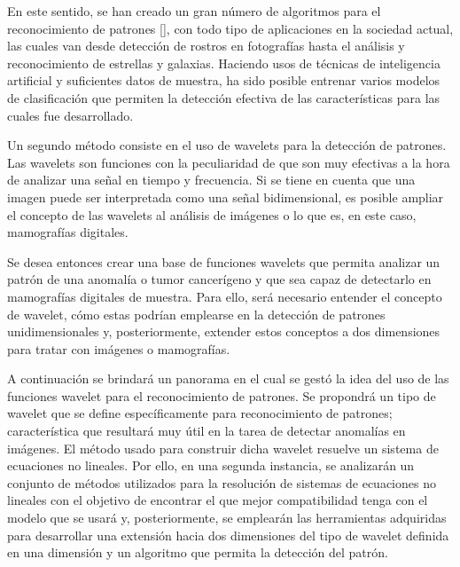 \par En este sentido, se han creado un gran n\'umero de algoritmos para el reconocimiento de patrones [\cite{20}], con todo tipo de aplicaciones en la sociedad actual, las cuales van desde detecci\'on de rostros en fotograf\'ias hasta el an\'alisis y reconocimiento de estrellas y galaxias. Haciendo usos de t\'ecnicas de inteligencia artificial y suficientes datos de muestra, ha sido posible entrenar varios modelos de clasificaci\'on que permiten la detecci\'on efectiva de las caracter\'isticas para las cuales fue desarrollado.

\par Un segundo m\'etodo consiste en el uso de wavelets para la detecci\'on de patrones. Las wavelets son funciones con la peculiaridad de que son muy efectivas a la hora de analizar una se\~nal en tiempo y frecuencia. Si se tiene en cuenta que una imagen puede ser interpretada como una se\~nal bidimensional, es posible ampliar el concepto de las wavelets al an\'alisis de im\'agenes o lo que es, en este caso, mamograf\'ias digitales.

\par Se desea entonces crear una base de funciones wavelets que permita analizar un patr\'on de una anomal\'ia o tumor cancer\'igeno y que sea capaz de detectarlo en mamograf\'ias digitales de muestra. Para ello, ser\'a necesario entender el concepto de wavelet, c\'omo estas podr\'ian emplearse en la detecci\'on de patrones unidimensionales y, posteriormente, extender estos conceptos a dos dimensiones para tratar con im\'agenes o mamograf\'ias.

\par A continuaci\'on se brindar\'a un panorama en el cual se gest\'o la idea del uso de las funciones wavelet para el reconocimiento de patrones. Se propondr\'a un tipo de wavelet que se define espec\'ificamente para reconocimiento de patrones; caracter\'istica que resultar\'a muy \'util en la tarea de detectar anomal\'ias en im\'agenes. El método usado para construir dicha wavelet resuelve un sistema de ecuaciones no lineales. Por ello, en una segunda instancia, se analizar\'an un conjunto de m\'etodos utilizados para la resoluci\'on de sistemas de ecuaciones no lineales con el objetivo de encontrar el que mejor compatibilidad tenga con el modelo que se usar\'a y, posteriormente, se emplear\'an las herramientas adquiridas para desarrollar una extensi\'on hacia dos dimensiones del tipo de wavelet definida en una dimensi\'on y un algoritmo que permita la detecci\'on del patr\'on.

